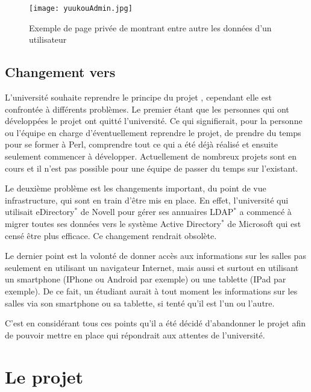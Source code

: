 \begin{figure}[!ht]
	\centering
	\texttt{[image: yuukouAdmin.jpg]}
	\caption{Exemple de page priv\'ee de \Yuukou{} montrant entre autre les donn\'ees d'un utilisateur}
	\label{figure:yuukouAdmin}

\end{figure}

\subsection{Changement vers \YuukouII}

L'universit\'e souhaite reprendre le principe du projet \Yuukou, cependant elle est confront\'ee \`a diff\'erents probl\`emes.
Le premier \'etant que les personnes qui ont d\'evelopp\'ees le projet ont quitt\'e l'universit\'e. 
Ce qui signifierait, pour la personne ou l'\'equipe en charge d'\'eventuellement reprendre le projet, de prendre du temps pour se former \`a Perl, comprendre tout ce qui a \'et\'e d\'ej\`a r\'ealis\'e et ensuite seulement commencer \`a d\'evelopper.
Actuellement de nombreux projets sont en cours et il n'est pas possible pour une \'equipe de passer du temps sur l'existant.

Le deuxi\`eme probl\`eme est les changements important, du point de vue infrastructure, qui sont en train d'\^etre mis en place.
En effet, l'universit\'e qui utilisait eDirectory$^*$ de Novell pour g\'erer ses annuaires LDAP$^*$ a commenc\'e \`a migrer toutes ses donn\'ees vers le syst\`eme Active Directory$^*$ de Microsoft qui est cens\'e \^etre plus efficace. Ce changement rendrait \Yuukou{} obsol\`ete.

Le dernier point est la volont\'e de donner acc\`es aux informations sur les salles pas seulement en utilisant un navigateur Internet, mais aussi et surtout en utilisant un smartphone (IPhone ou Android par exemple) ou une tablette (IPad par exemple).
De ce fait, un \'etudiant aurait \`a tout moment les informations sur les salles via son smartphone ou sa tablette, si tent\'e qu'il est l'un ou l'autre.

C'est en consid\'erant tous ces points qu'il a \'et\'e d\'ecid\'e d'abandonner le projet \Yuukou{} afin de pouvoir mettre en place \YuukouII{} qui r\'epondrait aux attentes de l'universit\'e.

\section{Le projet \YuukouII}


